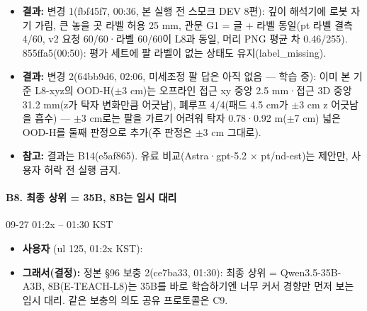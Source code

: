 \begin{itemize}
  \item \textbf{결과:} 변경 1(fbf45f7, 00:36, 본 실행 전 스모크 DEV 8편): 깊이 해석기에 로봇 자기 가림, 큰 놓을 곳 라벨 허용 25 mm, 관문 G1 = 글 + 라벨 동일(pt 라벨 결측 4/60, v2 요청 60/60·라벨 60/60이 L8과 동일, 머리 PNG 평균 차 0.46/255). 855ffa5(00:50): 평가 세트에 팔 라벨이 없는 상태도 유지(label\_missing).
  \item \textbf{결과:} 변경 2(64bb9d6, 02:06, 미세조정 팔 답은 아직 없음 --- 학습 중): 이미 본 기준 L8-xyz의 OOD-H($\pm$3 cm)는 오프라인 접근 xy 중앙 2.5 mm·접근 3D 중앙 31.2 mm(z가 탁자 변화만큼 어긋남), 폐루프 4/4(패드 4.5 cm가 $\pm$3 cm z 어긋남을 흡수) --- $\pm$3 cm로는 팔을 가르기 어려워 탁자 0.78·0.92 m($\pm$7 cm) 넓은 OOD-H를 둘째 판정으로 추가(주 판정은 $\pm$3 cm 그대로).
  \item \textbf{참고:} 결과는 B14(e5af865). 유료 비교(Astra·gpt-5.2 $\times$ pt/nd-est)는 제안만, 사용자 허락 전 실행 금지.
\end{itemize}

\paragraph{B8. 최종 상위 = 35B, 8B는 임시 대리}
{\small 09-27 01:2x -- 01:30 KST}
\begin{itemize}
  \item \textbf{사용자} (ul 125, 01:2x KST): 
  \item \textbf{그래서(결정):} 정본 §96 보충 2(ce7ba33, 01:30): 최종 상위 = Qwen3.5-35B-A3B, 8B(E-TEACH-L8)는 35B를 바로 학습하기엔 너무 커서 경향만 먼저 보는 임시 대리. 같은 보충의 의도 공유 프로토콜은 C9.
\end{itemize}


